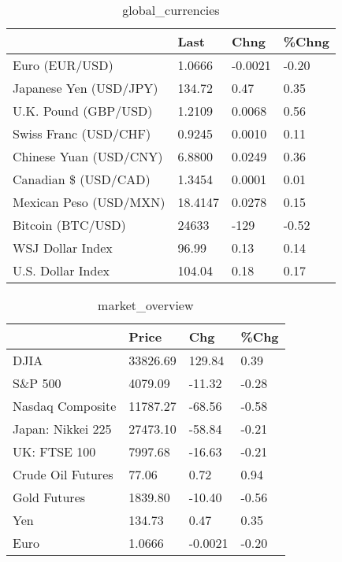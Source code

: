 \documentclass{article}%
\begin{document}
%


\begin{table}[htbp]%
\caption{global\_currencies}%
\centering%
\begin{adjustbox}{width=1\textwidth}%
\begin{tabular}{llll}
\toprule
                       &    Last &    Chng & \%Chng \\
\midrule
        Euro (EUR/USD) &  1.0666 & -0.0021 & -0.20 \\
Japanese Yen (USD/JPY) &  134.72 &    0.47 &  0.35 \\
  U.K. Pound (GBP/USD) &  1.2109 &  0.0068 &  0.56 \\
 Swiss Franc (USD/CHF) &  0.9245 &  0.0010 &  0.11 \\
Chinese Yuan (USD/CNY) &  6.8800 &  0.0249 &  0.36 \\
  Canadian \$ (USD/CAD) &  1.3454 &  0.0001 &  0.01 \\
Mexican Peso (USD/MXN) & 18.4147 &  0.0278 &  0.15 \\
     Bitcoin (BTC/USD) &   24633 &    -129 & -0.52 \\
      WSJ Dollar Index &   96.99 &    0.13 &  0.14 \\
     U.S. Dollar Index &  104.04 &    0.18 &  0.17 \\
\bottomrule
\end{tabular}
%
\end{adjustbox}%
\end{table}

%


\begin{table}[htbp]%
\caption{market\_overview}%
\centering%
\begin{adjustbox}{width=1\textwidth}%
\begin{tabular}{llll}
\toprule
                  &    Price &     Chg &  \%Chg \\
\midrule
             DJIA & 33826.69 &  129.84 &  0.39 \\
          S\&P 500 &  4079.09 &  -11.32 & -0.28 \\
 Nasdaq Composite & 11787.27 &  -68.56 & -0.58 \\
Japan: Nikkei 225 & 27473.10 &  -58.84 & -0.21 \\
     UK: FTSE 100 &  7997.68 &  -16.63 & -0.21 \\
Crude Oil Futures &    77.06 &    0.72 &  0.94 \\
     Gold Futures &  1839.80 &  -10.40 & -0.56 \\
              Yen &   134.73 &    0.47 &  0.35 \\
             Euro &   1.0666 & -0.0021 & -0.20 \\
\bottomrule
\end{tabular}
%
\end{adjustbox}%
\end{table}

%
\end{document}
